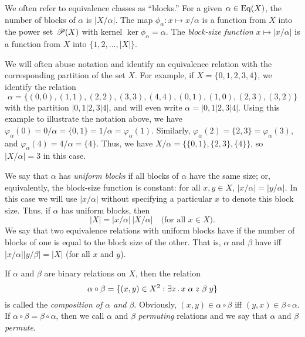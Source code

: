 We often refer to equivalence classes as
``blocks.''  
For a given $\alpha\in \operatorname{Eq}(X)$, the number of blocks 
of $\alpha$ is $|X/\alpha|$. The map $\phi_\alpha: x \mapsto x/\alpha$ is a
function from $X$ into the power set $\mathscr{P}(X)$
with kernel $\ker \phi_\alpha = \alpha$.
The \emph{block-size function} $x \mapsto |x/\alpha|$ is a function from $X$ 
into $\{1,2,\dots, |X|\}$. 

We will often abuse notation and identify an equivalence relation with the
corresponding partition of the set $X$.  For example, if $X = \{0,1,2,3,4\}$, 
we identify the relation 
\[
\alpha = \{(0,0), (1,1), (2,2), (3,3), (4,4), (0,1), (1,0), (2,3), (3,2)\}%
\]
with the partition $|0,1|2,3|4|$, and will even write $\alpha = |0,1|2,3|4|$. 
Using this example to illustrate the notation above, we have
$\varphi_\alpha(0) = 0/\alpha = \{0,1\} = 1/\alpha = \varphi_\alpha(1)$.
Similarly, $\varphi_\alpha(2) = \{2,3\}= \varphi_\alpha(3)$, and 
$\varphi_\alpha(4) = 4/\alpha = \{4\}$.  Thus, we have $X/\alpha = \{\{0,1\}, \{2,3\}, \{4\}\}$, so
$|X/\alpha| = 3$ in this case.

We say that $\alpha$ has \emph{uniform blocks} if all blocks of  $\alpha$ have
the same size; or, equivalently, the block-size function is constant: for all 
$x, y \in X$, $|x/\alpha| = |y/\alpha|$.  
In this case we will use $|x/\alpha|$ without specifying
a particular $x$ to denote this block size.
Thus, if $\alpha$
has uniform blocks, then
\[
|X|= |x/\alpha| \,|X/\alpha| %
\quad \text{(for all $x\in X$).}
\]
We say that two equivalence relations with uniform
blocks  have 
 if the number of blocks of one is equal to
the block size of the other. That is,
$\alpha$ and $\beta$ 
have \cubs
iff $|x/\alpha||y/\beta| = |X|$ (for all $x$ and $y$).


If $\alpha$ and $\beta$ are binary relations on $X$, then the relation
\begin{equation}
  \label{eq:7}
\alpha \circ \beta = \{(x,y) \in X^2: \exists z\,.\, x \mathrel{\alpha} z \mathrel{\beta} y\}
\end{equation}
is called the \emph{composition of $\alpha$ and $\beta$}. 
Obviously, $(x,y) \in \alpha\circ \beta$ iff $(y,x) \in \beta\circ \alpha$.
If $\alpha \circ \beta = \beta \circ \alpha$, then we call $\alpha$ and $\beta$ 
\emph{permuting} relations and we say that $\alpha$ and $\beta$ \emph{permute}. 

